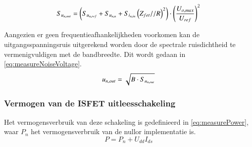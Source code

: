 \begin{equation}\label{eq:measureNoiseFull}
    S_{u_{{n,out}}} = \left(S_{u_{{n,ref}}} + S_{u_{{n,n}}} + S_{i_{{n,in}}}\left(Z_{fet} // R\right)^2\right) \cdot \left(\frac{U_{o,max}}{U_{ref}}\right)^2
    \tagaddtext{[\si{\volt\squared\per\hertz}]}
\end{equation}

Aangezien er geen frequentieafhankelijkheden voorkomen kan de uitgangsspanningsruis uitgerekend worden door de spectrale ruisdichtheid te vermenigvuldigen met de bandbreedte. Dit wordt gedaan in \cref{eq:measureNoiseVoltage}.
\begin{equation}\label{eq:measureNoiseVoltage}
    u_{n,out} = \sqrt{B \cdot S_{u_{{n,out}}}}
    \tagaddtext{[\si{\volt}]}
\end{equation}

\subsubsection{Vermogen van de ISFET uitleesschakeling}
Het vermogensverbruik van deze schakeling is gedefinieerd in \cref{eq:measurePower}, waar $P_n$ het vermogensverbruik van de nullor implementatie is.
\begin{equation}\label{eq:measurePower}
    P = P_n + U_{dd}I_{ds}
\end{equation}


